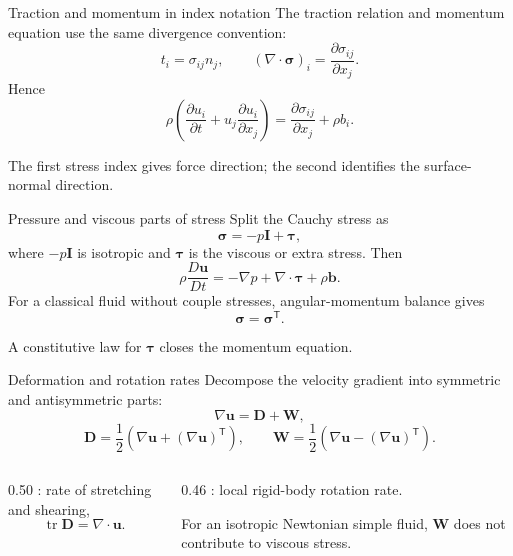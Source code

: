 \documentclass[aspectratio=169,11pt]{beamer}
\newcommand{\uvec}{\bm{u}}
\newcommand{\bvec}{\bm{b}}
\newcommand{\stress}{\bm{\sigma}}
\newcommand{\taustress}{\bm{\tau}}
\newcommand{\Dtensor}{\mathbf{D}}
\newcommand{\Wtensor}{\mathbf{W}}
\newcommand{\Identity}{\mathbf{I}}
\begin{document}
\begin{frame}{Traction and momentum in index notation}
The traction relation and momentum equation use the same divergence convention:
\[
  t_i=\sigma_{ij}n_j,
  \qquad
  (\nabla\cdot\stress)_i
  =\frac{\partial\sigma_{ij}}{\partial x_j}.
\]
Hence
\[
  \boxed{
  \rho\left(
  \frac{\partial u_i}{\partial t}
  +u_j\frac{\partial u_i}{\partial x_j}
  \right)
  =\frac{\partial\sigma_{ij}}{\partial x_j}
  +\rho b_i}.
\]
\begin{punchbox}
\small The first stress index gives force direction; the second identifies the surface-normal direction.
\end{punchbox}
\end{frame}

\begin{frame}{Pressure and viscous parts of stress}
Split the Cauchy stress as
\[
  \boxed{\stress=-p\Identity+\taustress},
\]
where $-p\Identity$ is isotropic and $\taustress$ is the viscous or extra stress. Then
\[
  \rho\frac{D\uvec}{Dt}
  =-\nabla p+\nabla\cdot\taustress+\rho\bvec.
\]
For a classical fluid without couple stresses, angular-momentum balance gives
\[
  \stress=\stress^{\mathsf T}.
\]
\begin{punchbox}
\small A constitutive law for $\taustress$ closes the momentum equation.
\end{punchbox}
\end{frame}

\begin{frame}{Deformation and rotation rates}
Decompose the velocity gradient into symmetric and antisymmetric parts:
\[
  \nabla\uvec=\Dtensor+\Wtensor,
\]
\[
  \Dtensor=\frac12\left(\nabla\uvec+(\nabla\uvec)^{\mathsf T}\right),
  \qquad
  \Wtensor=\frac12\left(\nabla\uvec-(\nabla\uvec)^{\mathsf T}\right).
\]
\begin{columns}[T,onlytextwidth]
\begin{column}{0.50\textwidth}
\hi{$\Dtensor$}: rate of stretching and shearing,
\[
  \operatorname{tr}\Dtensor=\nabla\cdot\uvec.
\]
\end{column}
\begin{column}{0.46\textwidth}
\hi{$\Wtensor$}: local rigid-body rotation rate.

For an isotropic Newtonian simple fluid, $\Wtensor$ does not contribute to viscous stress.
\end{column}
\end{columns}
\end{frame}
\end{document}
